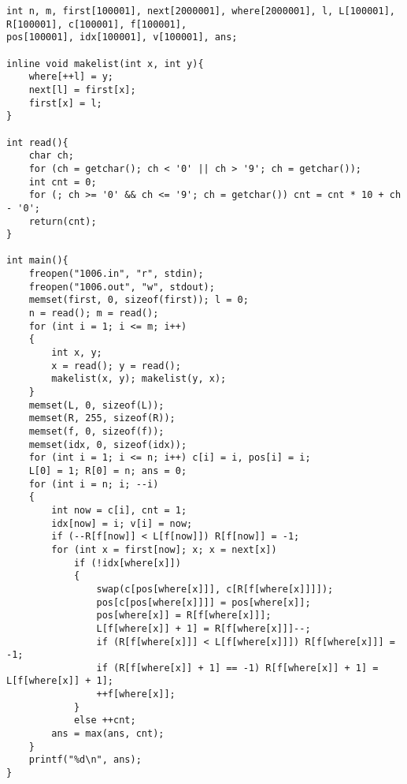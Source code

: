 \begin{lstlisting}
int n, m, first[100001], next[2000001], where[2000001], l, L[100001], R[100001], c[100001], f[100001],
pos[100001], idx[100001], v[100001], ans;

inline void makelist(int x, int y){
    where[++l] = y;
    next[l] = first[x];
    first[x] = l;
}

int read(){
    char ch;
    for (ch = getchar(); ch < '0' || ch > '9'; ch = getchar());
    int cnt = 0;
    for (; ch >= '0' && ch <= '9'; ch = getchar()) cnt = cnt * 10 + ch - '0';
    return(cnt);
}

int main(){
    freopen("1006.in", "r", stdin);
    freopen("1006.out", "w", stdout);
    memset(first, 0, sizeof(first)); l = 0;
    n = read(); m = read();
    for (int i = 1; i <= m; i++)
    {
        int x, y;
        x = read(); y = read();
        makelist(x, y); makelist(y, x);
    }
    memset(L, 0, sizeof(L));
    memset(R, 255, sizeof(R));
    memset(f, 0, sizeof(f));
    memset(idx, 0, sizeof(idx));
    for (int i = 1; i <= n; i++) c[i] = i, pos[i] = i;
    L[0] = 1; R[0] = n; ans = 0;
    for (int i = n; i; --i)
    {
        int now = c[i], cnt = 1;
        idx[now] = i; v[i] = now;
        if (--R[f[now]] < L[f[now]]) R[f[now]] = -1;
        for (int x = first[now]; x; x = next[x])
            if (!idx[where[x]])
            {
                swap(c[pos[where[x]]], c[R[f[where[x]]]]);
                pos[c[pos[where[x]]]] = pos[where[x]];
                pos[where[x]] = R[f[where[x]]];
                L[f[where[x]] + 1] = R[f[where[x]]]--;
                if (R[f[where[x]]] < L[f[where[x]]]) R[f[where[x]]] = -1;
                if (R[f[where[x]] + 1] == -1) R[f[where[x]] + 1] = L[f[where[x]] + 1];
                ++f[where[x]];
            }
            else ++cnt;
        ans = max(ans, cnt);
    }
    printf("%d\n", ans);
}
\end{lstlisting}
